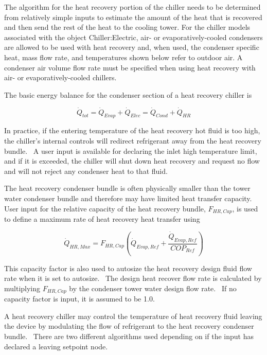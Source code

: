 The algorithm for the heat recovery portion of the chiller needs to be determined from relatively simple inputs to estimate the amount of the heat that is recovered and then send the rest of the heat to the cooling tower. For the chiller models associated with the object Chiller:Electric, air- or evaporatively-cooled condensers are allowed to be used with heat recovery and, when used, the condenser specific heat, mass flow rate, and temperatures shown below refer to outdoor air. A condenser air volume flow rate must be specified when using heat recovery with air- or evaporatively-cooled chillers.

The basic energy balance for the condenser section of a heat recovery chiller is

\begin{equation}
{\dot Q_{tot}} = {\dot Q_{Evap}} + {\dot Q_{Elec}} = {\dot Q_{Cond}} + {\dot Q_{HR}}
\end{equation}

In practice, if the entering temperature of the heat recovery hot fluid is too high, the chiller's internal controls will redirect refrigerant away from the heat recovery bundle.~ A user input is available for declaring the inlet high temperature limit, and if it is exceeded, the chiller will shut down heat recovery and request no flow and will not reject any condenser heat to that fluid.

The heat recovery condenser bundle is often physically smaller than the tower water condenser bundle and therefore may have limited heat transfer capacity.~ User input for the relative capacity of the heat recovery bundle, \({F_{HR,Cap}}\), is used to define a maximum rate of heat recovery heat transfer using

\begin{equation}
{\dot Q_{HR,Max}} = {F_{HR,Cap}}\left( {{{\dot Q}_{Evap,Ref}} + \frac{{{{\dot Q}_{Evap,Ref}}}}{{CO{P_{Ref}}}}} \right)
\end{equation}

This capacity factor is also used to autosize the heat recovery design fluid flow rate when it is set to autosize.~ The design heat recover flow rate is calculated by multiplying \({F_{HR,Cap}}\) by the condenser tower water design flow rate.~ If no capacity factor is input, it is assumed to be 1.0.

A heat recovery chiller may control the temperature of heat recovery fluid leaving the device by modulating the flow of refrigerant to the heat recovery condenser bundle.~ There are two different algorithms used depending on if the input has declared a leaving setpoint node.

